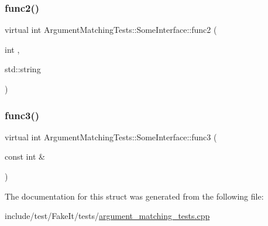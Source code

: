 \subsubsection{\texorpdfstring{func2()}{func2()}}
{\footnotesize\ttfamily virtual int Argument\+Matching\+Tests\+::\+Some\+Interface\+::func2 (\begin{DoxyParamCaption}\item[{int}]{,  }\item[{std\+::string}]{ }\end{DoxyParamCaption})\hspace{0.3cm}{\ttfamily [pure virtual]}}

\mbox{\label{structArgumentMatchingTests_1_1SomeInterface_af1728034049767cbce3bc3ef052ec05b}} 
\subsubsection{\texorpdfstring{func3()}{func3()}}
{\footnotesize\ttfamily virtual int Argument\+Matching\+Tests\+::\+Some\+Interface\+::func3 (\begin{DoxyParamCaption}\item[{const int \&}]{ }\end{DoxyParamCaption})\hspace{0.3cm}{\ttfamily [pure virtual]}}



The documentation for this struct was generated from the following file\+:\begin{DoxyCompactItemize}
\item 
include/test/\+Fake\+It/tests/\mbox{\hyperlink{argument__matching__tests_8cpp}{argument\+\_\+matching\+\_\+tests.\+cpp}}\end{DoxyCompactItemize}
